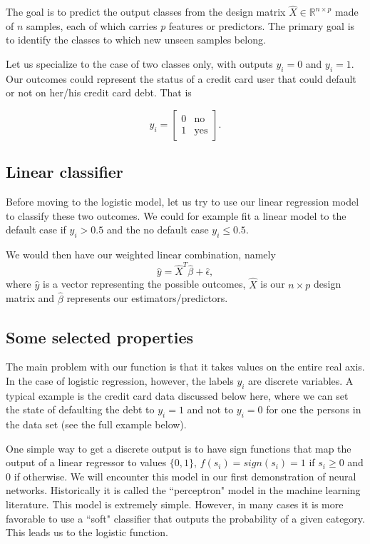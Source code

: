 \documentclass[%
oneside,                 %
final,                   %
10pt]{article}
\begin{document}
The goal is to predict the
output classes from the design matrix $\hat{X}\in\mathbb{R}^{n\times p}$
made of $n$ samples, each of which carries $p$ features or predictors. The
primary goal is to identify the classes to which new unseen samples
belong.

Let us specialize to the case of two classes only, with outputs
$y_i=0$ and $y_i=1$. Our outcomes could represent the status of a
credit card user that could default or not on her/his credit card
debt. That is


\[
y_i = \begin{bmatrix} 0 & \mathrm{no}\\  1 & \mathrm{yes} \end{bmatrix}.
\]



\subsection{Linear classifier}

Before moving to the logistic model, let us try to use our linear
regression model to classify these two outcomes. We could for example
fit a linear model to the default case if $y_i > 0.5$ and the no
default case $y_i \leq 0.5$.

We would then have our 
weighted linear combination, namely 
\begin{equation}
\hat{y} = \hat{X}^T\hat{\beta} +  \hat{\epsilon},
\end{equation}
where $\hat{y}$ is a vector representing the possible outcomes, $\hat{X}$ is our
$n\times p$ design matrix and $\hat{\beta}$ represents our estimators/predictors.

\subsection{Some selected properties}

The main problem with our function is that it takes values on the
entire real axis. In the case of logistic regression, however, the
labels $y_i$ are discrete variables. A typical example is the credit
card data discussed below here, where we can set the state of
defaulting the debt to $y_i=1$ and not to $y_i=0$ for one the persons
in the data set (see the full example below).

One simple way to get a discrete output is to have sign
functions that map the output of a linear regressor to values $\{0,1\}$,
$f(s_i)=sign(s_i)=1$ if $s_i\ge 0$ and 0 if otherwise. 
We will encounter this model in our first demonstration of neural networks. Historically it is called the ``perceptron" model in the machine learning
literature. This model is extremely simple. However, in many cases it is more
favorable to use a ``soft" classifier that outputs
the probability of a given category. This leads us to the logistic function.
\end{document}
